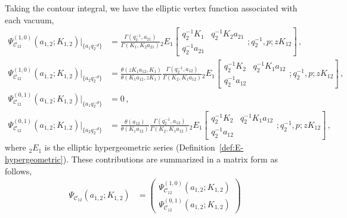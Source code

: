 \begin{lemma}
    Taking the contour integral, we have the elliptic vertex function associated with each vacuum,
    \begin{subequations}
    \begin{align}
        \Psi_{\mathscr{C}_{12}}^{(1,0)}(a_{1,2};K_{1,2})\Big|_{\{a_1 q_2^{-d}\}} & = 
        \frac{\Gamma(q_2^{-1},a_{21})}{\Gamma(K_1,K_2 a_{21})} {_2 E_1}
        \left[
        \begin{matrix}
            q_2^{-1} K_1 & q_2^{-1} K_2 a_{21} \\ q_2^{-1} a_{21}
        \end{matrix} ; q_2^{-1}, p ; z K_{12} 
        \right]
        \, , \\
        \Psi_{\mathscr{C}_{12}}^{(1,0)}(a_{1,2};K_{1,2})\Big|_{\{a_2 q_2^{-d}\}} & = 
        \frac{\theta(z K_1 a_{12}, K_1) }{\theta(K_1 a_{12}, z K_1)}
        \frac{\Gamma(q_2^{-1},a_{12})}{\Gamma(K_2,K_1 a_{12})} {_2 E_1}
        \left[
        \begin{matrix}
            q_2^{-1} K_2 & q_2^{-1} K_1 a_{12} \\ q_2^{-1} a_{12}
        \end{matrix} ; q_2^{-1}, p ; z K_{12} 
        \right]
        \, , \\
        \Psi_{\mathscr{C}_{12}}^{(0,1)}(a_{1,2};K_{1,2})\Big|_{\{a_1 q_2^{-d}\}} & = 0
        \, , \\
        \Psi_{\mathscr{C}_{12}}^{(0,1)}(a_{1,2};K_{1,2})\Big|_{\{a_2 q_2^{-d}\}} & = 
        \frac{\theta(a_{12}) }{\theta(K_1 a_{12}) }
        \frac{\Gamma(q_2^{-1},a_{12})}{\Gamma(K_2,K_1 a_{12})} {_2 E_1}
        \left[
        \begin{matrix}
            q_2^{-1} K_2 & q_2^{-1} K_1 a_{12} \\ q_2^{-1} a_{12}
        \end{matrix} ; q_2^{-1}, p ; z K_{12} 
        \right]
        \, ,
    \end{align}
    \end{subequations}
    where ${}_2 E_1$ is the elliptic hypergeometric series (Definition~\ref{def:E-hypergeometric}).
    These contributions are summarized in a matrix form as follows,
    \begin{align}
        \Psi_{\mathscr{C}_{12}}(a_{1,2};K_{1,2}) & = 
        \begin{pmatrix}
            \Psi_{\mathscr{C}_{12}}^{(1,0)}(a_{1,2};K_{1,2}) \\ \Psi_{\mathscr{C}_{12}}^{(0,1)}(a_{1,2};K_{1,2})

\end{pmatrix}
\end{align}
\end{lemma}
